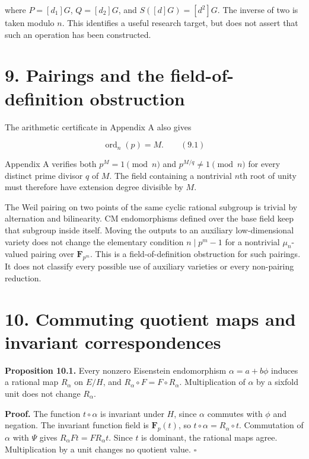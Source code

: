 \documentclass[
  11pt,
  a4paper,
]{article}
\begin{document}
where \(P=[d_1]G\), \(Q=[d_2]G\), and \(S([d]G)=[d^2]G\). The inverse of
two is taken modulo \(n\). This identifies a useful research target, but
does not assert that such an operation has been constructed.

\section{9. Pairings and the field-of-definition
obstruction}\label{pairings-and-the-field-of-definition-obstruction}

The arithmetic certificate in Appendix A also gives

\[
\operatorname{ord}_n(p)=M. \qquad (9.1)
\]

Appendix A verifies both \(p^M=1\pmod n\) and \(p^{M/q}\neq1\pmod n\)
for every distinct prime divisor \(q\) of \(M\). The field containing a
nontrivial \(n\)th root of unity must therefore have extension degree
divisible by \(M\).

The Weil pairing on two points of the same cyclic rational subgroup is
trivial by alternation and bilinearity. CM endomorphisms defined over
the base field keep that subgroup inside itself. Moving the outputs to
an auxiliary low-dimensional variety does not change the elementary
condition \(n\mid p^m-1\) for a nontrivial \(\mu_n\)-valued pairing over
\(\mathbf F_{p^m}\). This is a field-of-definition obstruction for such
pairings. It does not classify every possible use of auxiliary varieties
or every non-pairing reduction.

\section{10. Commuting quotient maps and invariant
correspondences}\label{commuting-quotient-maps-and-invariant-correspondences}

\textbf{Proposition 10.1.} Every nonzero Eisenstein endomorphism
\(\alpha=a+b\phi\) induces a rational map \(R_\alpha\) on \(E/H\), and
\(R_\alpha\circ F=F\circ R_\alpha\). Multiplication of \(\alpha\) by a
sixfold unit does not change \(R_\alpha\).

\textbf{Proof.} The function \(t\circ\alpha\) is invariant under \(H\),
since \(\alpha\) commutes with \(\phi\) and negation. The invariant
function field is \(\mathbf F_p(t)\), so
\(t\circ\alpha=R_\alpha\circ t\). Commutation of \(\alpha\) with
\(\Psi\) gives \(R_\alpha F t=F R_\alpha t\). Since \(t\) is dominant,
the rational maps agree. Multiplication by a unit changes no quotient
value. \(\square\)
\end{document}

